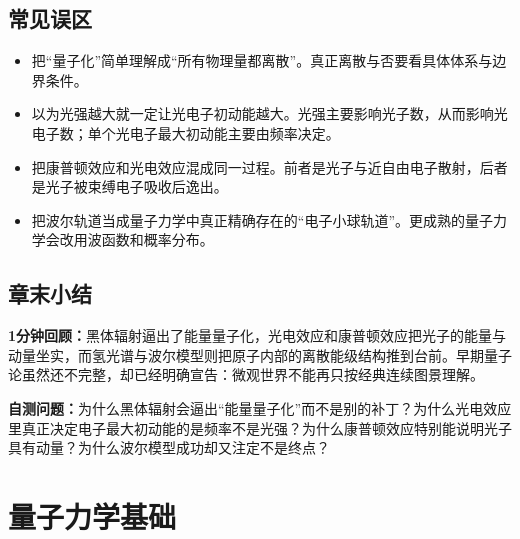 \documentclass[lang=cn,11pt]{elegantbook}
\newcommand{\summaryline}[1]{\par\noindent\textbf{1分钟回顾：}#1\par}
\newcommand{\chapterselfcheck}[1]{\par\noindent\textbf{自测问题：}#1\par}
\begin{document}
\section{常见误区}

\begin{itemize}
 \item 把“量子化”简单理解成“所有物理量都离散”。真正离散与否要看具体体系与边界条件。
 \item 以为光强越大就一定让光电子初动能越大。光强主要影响光子数，从而影响光电子数；单个光电子最大初动能主要由频率决定。
 \item 把康普顿效应和光电效应混成同一过程。前者是光子与近自由电子散射，后者是光子被束缚电子吸收后逸出。
 \item 把波尔轨道当成量子力学中真正精确存在的“电子小球轨道”。更成熟的量子力学会改用波函数和概率分布。
\end{itemize}

\section{章末小结}

\summaryline{黑体辐射逼出了能量量子化，光电效应和康普顿效应把光子的能量与动量坐实，而氢光谱与波尔模型则把原子内部的离散能级结构推到台前。早期量子论虽然还不完整，却已经明确宣告：微观世界不能再只按经典连续图景理解。}
\chapterselfcheck{为什么黑体辐射会逼出“能量量子化”而不是别的补丁？为什么光电效应里真正决定电子最大初动能的是频率不是光强？为什么康普顿效应特别能说明光子具有动量？为什么波尔模型成功却又注定不是终点？}

\chapter{量子力学基础}
\end{document}
